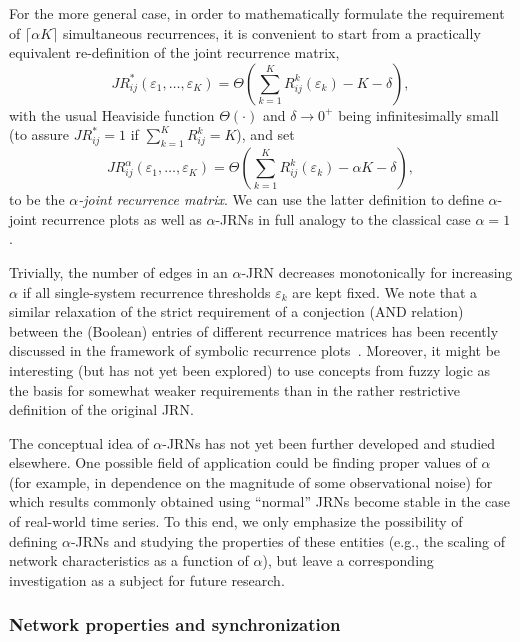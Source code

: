 For the more general case, in order to mathematically formulate the requirement of $\lceil\alpha K\rceil$ simultaneous recurrences, it is convenient to start from a practically equivalent re-definition of the joint recurrence matrix,
\begin{equation}
JR^*_{ij}(\varepsilon_1,\dots,\varepsilon_K) = \Theta\left( \sum_{k=1}^K R_{ij}^k(\varepsilon_k) -K-\delta \right),
\end{equation}
\noindent
with the usual Heaviside function $\Theta(\cdot)$ and $\delta\to 0^+$ being infinitesimally small (to assure $JR^*_{ij}=1$ if $\sum_{k=1}^K R_{ij}^k=K$), and set
\begin{equation}
JR^{\alpha}_{ij}(\varepsilon_1,\dots,\varepsilon_K) = \Theta\left( \sum_{k=1}^K R_{ij}^k(\varepsilon_k) -\alpha K-\delta \right),
\end{equation}
\noindent
to be the \emph{$\alpha$-joint recurrence matrix}. We can use the latter definition to define $\alpha$-joint recurrence plots as well as $\alpha$-JRNs in full analogy to the classical case $\alpha=1$.

Trivially, the number of edges in an $\alpha$-JRN decreases monotonically for increasing $\alpha$ if all single-system recurrence thresholds $\varepsilon_k$ are kept fixed. We note that a similar relaxation of the strict requirement of a conjection (AND relation) between the (Boolean) entries of different recurrence matrices has been recently discussed in the framework of symbolic recurrence plots~\cite{Donner2008}. Moreover, it might be interesting (but has not yet been explored) to use concepts from fuzzy logic as the basis for somewhat weaker requirements than in the rather restrictive definition of the original JRN.

The conceptual idea of $\alpha$-JRNs has not yet been further developed and studied elsewhere. One possible field of application could be finding proper values of $\alpha$ (for example, in dependence on the magnitude of some observational noise) for which results commonly obtained using ``normal'' JRNs become stable in the case of real-world time series. To this end, we only emphasize the possibility of defining $\alpha$-JRNs and studying the properties of these entities (e.g., the scaling of network characteristics as a function of $\alpha$), but leave a corresponding investigation as a subject for future research.



\subsubsection{Network properties and synchronization}


